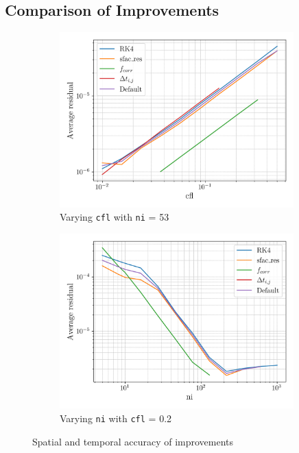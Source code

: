 \documentclass{article}
\begin{document}
\subsection{Comparison of Improvements}

\begin{figure}[H]
    \centering
    \begin{subfigure}{0.49\textwidth}
        \centering
        \includegraphics[width=0.99\textwidth]{figures/improvements_cfl_residual.png}
        \caption{Varying \texttt{cfl} with \texttt{ni} = 53}
        \label{fig:improvements_cfl_residual}
    \end{subfigure}
    \begin{subfigure}{0.49\textwidth}
        \centering
        \includegraphics[width=0.99\textwidth]{figures/improvements_ni_residual.png}
        \caption{Varying \texttt{ni} with \texttt{cfl} = 0.2}
        \label{fig:improvements_ni_residual}
    \end{subfigure}
    \caption{Spatial and temporal accuracy of improvements}
\end{figure}
\end{document}
